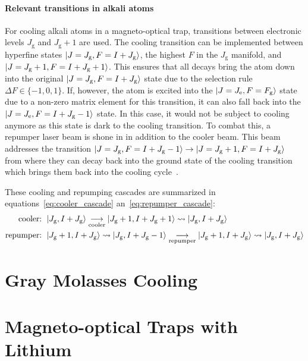 \paragraph{Relevant transitions in alkali atoms}
\sloppy For cooling alkali atoms in a magneto-optical trap, transitions between electronic levels $J_\text{g}$ and $J_\text{g} + 1$ are used. The cooling transition can be implemented between hyperfine states $\Ket{J = J_\text{g}, F = I + J_\text{g}}$, the highest $F$ in the $J_\text{g}$ manifold, and $\Ket{J = J_\text{g} + 1, F= I + J_\text{g} + 1}$. This ensures that all decays bring the atom down into the original $\Ket{J = J_\text{g}, F = I + J_\text{g}}$ state due to the selection rule $\Delta F \in \{-1, 0, 1\}$.
If, however, the atom is excited into the $\Ket{J = J_\text{e}, F = F_\text{g}}$ state due to a non-zero matrix element for this transition, it can also fall back into the $\Ket{J = J_\text{e}, F = I + J_\text{g} - 1}$ state. In this case, it would not be subject to cooling anymore as this state is dark to the cooling transition. To combat this, a repumper laser beam is shone in in addition to the cooler beam. This beam addresses the transition $\Ket{J = J_\text{g}, F = I + J_\text{g} - 1} \rightarrow \Ket{J = J_\text{g} + 1, F = I + J_\text{g}}$ from where they can decay back into the ground state of the cooling transition which brings them back into the cooling cycle~\cite{metcalf_laser_1999}.

These cooling and repumping cascades are summarized in equations~\eqref{eq:cooler_cascade} an~\eqref{eq:repumper_cascade}:
\begin{align}
    \label{eq:cooler_cascade}\text{cooler: } & \Ket{J_\text{g},I + J_\text{g}} \underset{\text{cooler}}{\longrightarrow} \Ket{J_\text{g} + 1, I + J_\text{g} + 1} \rightsquigarrow  \Ket{J_\text{g}, I + J_\text{g}}\\
    \label{eq:repumper_cascade}\text{repumper: } & \Ket{J_\text{g} + 1, I + J_\text{g}} \rightsquigarrow \Ket{J_\text{g}, I + J_\text{g} - 1}  \underset{\text{repumper}}{\longrightarrow} \Ket{J_\text{g} + 1, I + J_\text{g}} \rightsquigarrow  \Ket{J_\text{g}, I + J_\text{g}}
\end{align}


\section{Gray Molasses Cooling}


\section{Magneto-optical Traps with Lithium}

